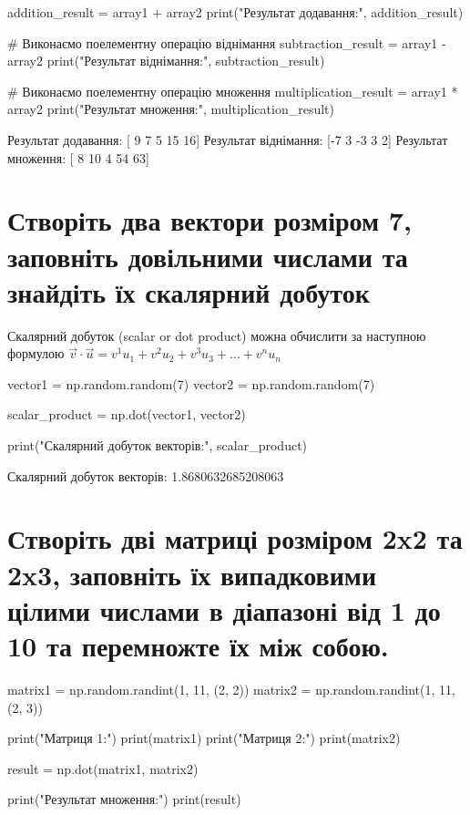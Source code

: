 \documentclass[]{article}
\newcounter{pythoncode}
\begin{document}
\begin{pythoncode}
addition_result = array1 + array2
print("Результат додавання:", addition_result)

# Виконаємо поелементну операцію віднімання
subtraction_result = array1 - array2
print("Результат віднімання:", subtraction_result)

# Виконаємо поелементну операцію множення
multiplication_result = array1 * array2
print("Результат множення:", multiplication_result)
\end{pythoncode}

\begin{out}
	Результат додавання: [ 9  7  5 15 16]
	Результат віднімання: [-7  3 -3  3  2]
	Результат множення: [ 8 10  4 54 63]
\end{out}

\section{Створіть два вектори розміром 7, заповніть довільними 	числами та знайдіть їх скалярний добуток}

Скалярний добуток (scalar or dot product) можна обчислити за наступною
формулою
\(\vec v \cdot \vec u = v^1 u_1 + v^2 u_2 + v^3 u_3 + \ldots + v^n u_n\)

\begin{pythoncode}
    vector1 = np.random.random(7)
    vector2 = np.random.random(7)

    scalar_product = np.dot(vector1, vector2)

    print("Скалярний добуток векторів:", scalar_product)
\end{pythoncode}

\begin{out}
	Скалярний добуток векторів: 1.8680632685208063
\end{out}

\section{Створіть дві матриці розміром 2x2 та 2x3, заповніть їх випадковими цілими числами в діапазоні від 1 до 10 та перемножте їх між собою.}

\begin{pythoncode}
    matrix1 = np.random.randint(1, 11, (2, 2))
    matrix2 = np.random.randint(1, 11, (2, 3))

    print("Матриця 1:")
    print(matrix1)
    print("Матриця 2:")
    print(matrix2)

    result = np.dot(matrix1, matrix2)

    print("Результат множення:")
    print(result)
\end{pythoncode}
\end{document}

